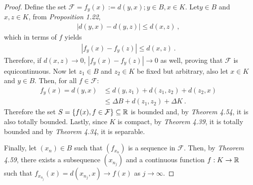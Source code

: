 \begin{questions}

\begin{solution}
  \begin{proof}
Define the set $\mathcal{F}={f_y(x):=d(y,x);y\in B, x\in K}$. Let$y\in B$ and $x,z\in K$, from \textit{Proposition 1.22},
\begin{align*}
\left| d(y,x)-d(y,z)\right|\leq d(x,z)~,
\end{align*}
which in terms of $f$ yields
\begin{align*}
\left| f_y(x)-f_y(z)\right|\leq d(x,z)~.
\end{align*}
Therefore, if $d(x,z)\rightarrow 0$, $\left| f_y(x)-f_y(z)\right|\rightarrow 0$ as well, proving that $\mathcal{F}$ is equicontinuous.
Now let $z_1\in B$ and $z_2\in K$ be fixed but arbitrary, also let $x\in K$ and $y\in B$. Then, for all $f\in\mathcal{F}$:
\begin{align*}
f_y(x)=d(y,x)&\leq d(y,z_1)+d(z_1,z_2)+d(z_2,x)\\
&\leq \Delta B+d(z_1,z_2)+\Delta K~.
\end{align*}
Therefore the set $S=\{f(x),f\in\mathcal{F}\}\subseteq \mathbb{R}$ is bounded and, by \textit{Theorem 4.54}, it is also totally bounded.
Lastly, since $K$ is compact, by \textit{Theorem 4.39}, it is totally bounded and by \textit{Theorem 4.34}, it is separable.

Finally, let $(x_n)\in B$ such that $(f_{x_n})$ is a sequence in $\mathcal{F}$. Then, by \textit{Theorem 4.59}, there exists a subsequence $(x_{n_j})$ and a continuous function $f:K\rightarrow\mathbb{R}$ such that $f_{x_{n_j}}(x)=d(x_{n_j},x)\rightarrow f(x)$ as $j\rightarrow\infty$.
  \end{proof}
\end{solution}

\end{questions}